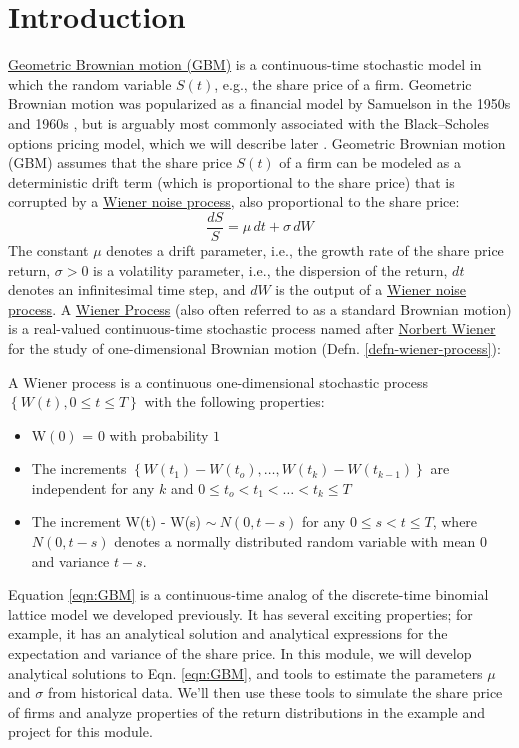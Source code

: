 \documentclass[11pt]{article}
\theoremstyle{definition}
\begin{document}
\section*{Introduction}
\href{https://en.wikipedia.org/wiki/Geometric_Brownian_motion}{Geometric Brownian motion (GBM)} is a continuous-time stochastic model in which the random variable $S(t)$, 
e.g., the share price of a firm. 
Geometric Brownian motion was popularized as a financial model by Samuelson in the 1950s and 1960s \cite{Merton2006}, 
but is arguably most commonly associated with the Black–Scholes options pricing model, which we will describe later 
\cite{BlackScholes1973}. Geometric Brownian motion (GBM) assumes that the share price $S(t)$ of a firm can be modeled as a deterministic
drift term (which is proportional to the share price) that is corrupted by a \href{https://en.wikipedia.org/wiki/Wiener_process}{Wiener noise process}, also proportional to the share price:
\begin{equation}\label{eqn:GBM}
\frac{dS}{S} = {\mu}\,dt + \sigma\,{dW}
\end{equation}
The constant $\mu$ denotes a drift parameter, i.e., the growth rate of the share price return, $\sigma>0$ is a volatility parameter, i.e., 
the dispersion of the return, $dt$ denotes an infinitesimal time step, and $dW$ is the output of a 
\href{https://en.wikipedia.org/wiki/Wiener_process}{Wiener noise process}.  A \href{https://en.wikipedia.org/wiki/Wiener_process)}{Wiener Process} 
(also often referred to as a standard Brownian motion) is a real-valued continuous-time stochastic 
process named after \href{https://en.wikipedia.org/wiki/Norbert_Wiener}{Norbert Wiener} for the study of one-dimensional Brownian motion (Defn. \ref{defn-wiener-process}):
\begin{definition}\label{defn-wiener-process}
A Wiener process is a continuous one-dimensional stochastic process $\left\{W\left(t\right), 0\leq{t}\leq{T}\right\}$ with the following properties:
\begin{itemize}
\setlength\itemsep{0em}
\item{W$\left(0\right)$ = $0$ with probability $1$}
\item{The increments $\left\{W(t_{1}) - W(t_{o}),\dots, W(t_{k}) - W(t_{k-1})\right\}$ are independent for any $k$ and $0\leq{t_{o}}< t_{1} < \dots < t_{k} \leq{T}$}
\item{The increment W(t) - W(s) $\sim~N\left(0,t-s\right)$ for any $0\leq{s}< t \leq{T}$, where $N\left(0,t-s\right)$ denotes a normally distributed random variable with mean $0$ and variance $t - s$.}
\end{itemize}
\end{definition}
Equation \ref{eqn:GBM} is a continuous-time analog of the discrete-time binomial lattice model we developed previously. 
It has several exciting properties; for example, it has an analytical solution and analytical expressions 
for the expectation and variance of the share price. In this module, we will develop analytical solutions to Eqn. \ref{eqn:GBM}, 
and tools to estimate the parameters $\mu$ and $\sigma$ from historical data. We'll then use these tools to simulate the share 
price of firms and analyze properties of the return distributions in the example and project for this module. 
\end{document}
